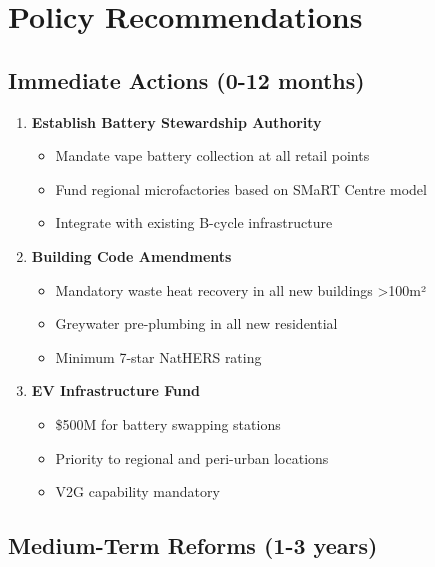 \documentclass[12pt,a4paper]{article}
\begin{document}
\section{Policy Recommendations}

\subsection{Immediate Actions (0-12 months)}

\begin{enumerate}
    \item \textbf{Establish Battery Stewardship Authority}
    \begin{itemize}
        \item Mandate vape battery collection at all retail points
        \item Fund regional microfactories based on SMaRT Centre model
        \item Integrate with existing B-cycle infrastructure
    \end{itemize}
    
    \item \textbf{Building Code Amendments}
    \begin{itemize}
        \item Mandatory waste heat recovery in all new buildings >100m²
        \item Greywater pre-plumbing in all new residential
        \item Minimum 7-star NatHERS rating
    \end{itemize}
    
    \item \textbf{EV Infrastructure Fund}
    \begin{itemize}
        \item \$500M for battery swapping stations
        \item Priority to regional and peri-urban locations
        \item V2G capability mandatory
    \end{itemize}
\end{enumerate}

\subsection{Medium-Term Reforms (1-3 years)}
\end{document}
